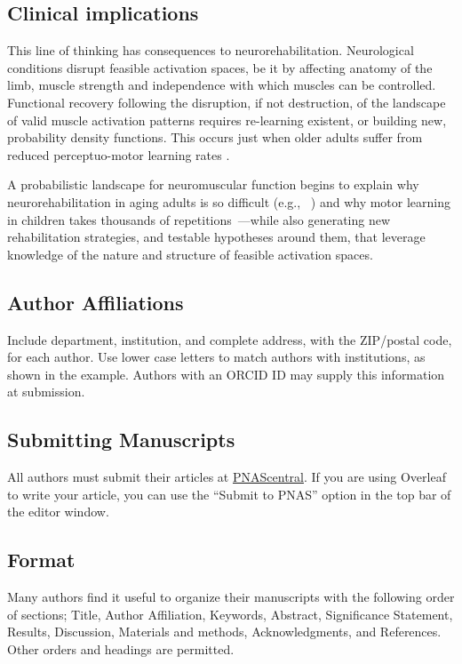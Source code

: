 \documentclass[9pt,twocolumn,twoside,lineno]{pnas-new}
\begin{document}
\subsection*{Clinical implications}
This line of thinking has consequences to neurorehabilitation. Neurological conditions disrupt feasible activation spaces, be it by affecting anatomy of the limb, muscle strength and independence with which muscles can be controlled. Functional recovery following the disruption, if not destruction, of the landscape of valid muscle activation patterns requires re-learning existent, or building new, probability density functions. This occurs just when older adults suffer from reduced perceptuo-motor learning rates \cite{coats201450scliff}.

A probabilistic landscape for neuromuscular function begins to explain why neurorehabilitation in aging adults is so difficult (e.g., ~\cite{hardwick2016motor}) and why motor learning in children takes thousands of repetitions~\cite{adolph2012thousands}---while also generating new rehabilitation strategies, and testable hypotheses around them, that leverage knowledge of the nature and structure of feasible activation spaces.

\subsection*{Author Affiliations}

Include department, institution, and complete address, with the ZIP/postal code, for each author. Use lower case letters to match authors with institutions, as shown in the example. Authors with an ORCID ID may supply this information at submission.

\subsection*{Submitting Manuscripts}

All authors must submit their articles at \href{http://www.pnascentral.org/cgi-bin/main.plex}{PNAScentral}. If you are using Overleaf to write your article, you can use the ``Submit to PNAS'' option in the top bar of the editor window.

\subsection*{Format}

Many authors find it useful to organize their manuscripts with the following order of sections;  Title, Author Affiliation, Keywords, Abstract, Significance Statement, Results, Discussion, Materials and methods, Acknowledgments, and References. Other orders and headings are permitted.
\end{document}
